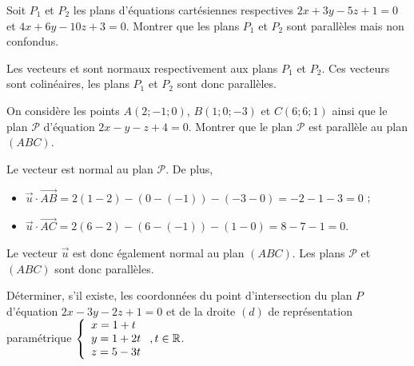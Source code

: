 \documentclass[11pt,fleqn, openany]{book} %
\begin{document}
\begin{exercise}[topic=geom14]Soit $P_1$ et $P_2$ les plans d'équations cartésiennes respectives $2x+3y-5z+1=0$ et $4x+6y-10z+3=0$. Montrer que les plans $P_1$ et $P_2$ sont parallèles mais non confondus.\end{exercise}

\begin{solution}Les vecteurs  et  sont normaux respectivement aux plans $P_1$ et $P_2$. Ces vecteurs sont colinéaires, les plans $P_1$ et $P_2$ sont donc parallèles.\end{solution}



\begin{exercise}[topic=geom14]On considère les points $A(2;-1;0)$, $B(1;0;-3)$ et $C(6;6;1)$ ainsi que le plan $\mathcal{P}$ d'équation  $2x-y-z+4=0$. Montrer que le plan $\mathcal{P}$ est parallèle au plan $(ABC)$.\end{exercise}

\begin{solution}Le vecteur  est normal au plan $\mathcal{P}$. De plus,
\begin{itemize}
\item $\vec u \cdot \overrightarrow{AB} = 2(1-2)-(0-(-1))-(-3-0)=-2-1-3=0$ ;
\item $\vec u \cdot \overrightarrow{AC} = 2(6-2)-(6-(-1))-(1-0)=8-7-1=0$.
\end{itemize}
Le vecteur $\vec u$ est donc également normal au plan $(ABC)$. Les plans $\mathcal{P}$ et $(ABC)$ sont donc parallèles.\end{solution}





\begin{exercise}[topic=geom14]Déterminer, s'il existe, les coordonnées du point d'intersection du plan $P$ d'équation  $ 2x-3y-2z+1=0$ et de la droite $(d)$ de représentation paramétrique $\left\{ \renewcommand{\arraystretch}{1}\renewcommand{\arraystretch}{1}\begin{array}{l}x=1+t \\ y=1+2t \\ z = 5-3t \\\end{array}\right., t \in \mathbb{R}$.\end{exercise}
\end{document}
